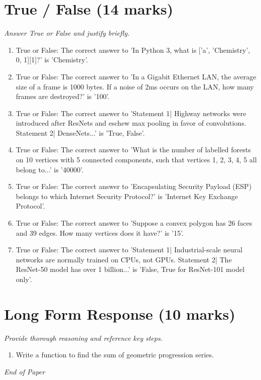 \documentclass[12pt]{article}
\begin{document}
\section*{True / False (14 marks)}
\textit{Answer True or False and justify briefly.}
\begin{enumerate}[label=\arabic*.]
\item True or False: The correct answer to 'In Python 3, what is ['a', 'Chemistry', 0, 1][1]?' is 'Chemistry'.
\item True or False: The correct answer to 'In a Gigabit Ethernet LAN, the average size of a frame is 1000 bytes. If a noise of 2ms occurs on the LAN, how many frames are destroyed?' is '100'.
\item True or False: The correct answer to 'Statement 1| Highway networks were introduced after ResNets and eschew max pooling in favor of convolutions. Statement 2| DenseNets...' is 'True, False'.
\item True or False: The correct answer to 'What is the number of labelled forests on 10 vertices with 5 connected components, such that vertices 1, 2, 3, 4, 5 all belong to...' is '40000'.
\item True or False: The correct answer to 'Encapsulating Security Payload (ESP) belongs to which Internet Security Protocol?' is 'Internet Key Exchange Protocol'.
\item True or False: The correct answer to 'Suppose a convex polygon has 26 faces and 39 edges. How many vertices does it have?' is '15'.
\item True or False: The correct answer to 'Statement 1| Industrial-scale neural networks are normally trained on CPUs, not GPUs. Statement 2| The ResNet-50 model has over 1 billion...' is 'False, True for ResNet-101 model only'.
\end{enumerate}

\section*{Long Form Response (10 marks)}
\textit{Provide thorough reasoning and reference key steps.}
\begin{enumerate}[label=\arabic*.]
\item Write a function to find the sum of geometric progression series.
\end{enumerate}

\vfill
\noindent\textit{End of Paper}
\end{document}
